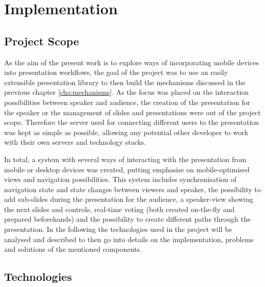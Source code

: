 \chapter{Implementation}
\label{cha:implementation}

\section{Project Scope}
\label{sec:implementation-scope}
As the aim of the present work is to explore ways of incorporating mobile devices into presentation workflows, the goal of the project was to use an easily extensible presentation library to then build the mechanisms discussed in the previous chapter \ref{cha:mechanisms}.
As the focus was placed on the interaction possibilities between speaker and audience, the creation of the presentation for the speaker or the management of slides and presentations were out of the project scope. Therefore the server used for connecting different users to the presentation was kept as simple as possible, allowing any potential other developer to work with their own servers and technology stacks.

In total, a system with several ways of interacting with the presentation from mobile or desktop devices was created, putting emphasise on mobile-optimised views and navigation possibilities. This system includes synchronisation of navigation state and state changes between viewers and speaker, the possibility to add sub-slides during the presentation for the audience, a speaker-view showing the next slides and controls, real-time voting (both created on-the-fly and prepared beforehands) and the possibility to create different paths through the presentation. In the following the technologies used in the project will be analysed and described to then go into details on the implementation, problems and solutions of the mentioned components.

\section{Technologies}
\label{sec:implementation-technologies}


